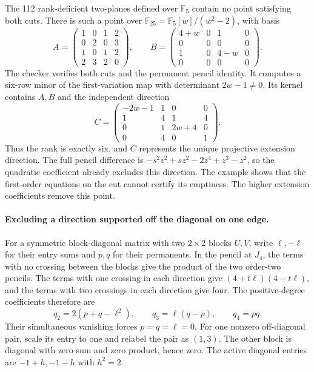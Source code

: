 The 112 rank-deficient two-planes defined over \(\mathbb F_5\) contain
no point satisfying both cuts. There is such a point over
\(\mathbb F_{25}=\mathbb F_5[w]/(w^2-2)\), with basis
\begin{equation*}
 A=\begin{pmatrix}1&0&1&2\\0&2&0&3\\1&0&1&2\\2&3&2&0\end{pmatrix},
 \qquad
 B=\begin{pmatrix}4+w&0&1&0\\0&0&0&0\\1&0&4-w&0\\0&0&0&0\end{pmatrix}.
\end{equation*}
The checker verifies both cuts and the permanent pencil identity.
It computes a six-row minor of the first-variation map with
determinant \(2w-1\ne0\). Its kernel contains \(A,B\) and the
independent direction
\begin{equation*}
 C=\begin{pmatrix}-2w-1&1&0&0\\1&4&1&4\\0&1&2w+4&0\\0&4&0&1\end{pmatrix}.
\end{equation*}
Thus the rank is exactly six, and \(C\) represents the unique
projective extension direction. The full pencil difference is
\(-s^2z^2+sz^2-2z^4+z^3-z^2\), so the quadratic coefficient
already excludes this direction. The example shows that the
first-order equations on the cut cannot certify its emptiness.
The higher extension coefficients remove this point.

\paragraph{Excluding a direction supported off the diagonal on one edge.}
For a symmetric block-diagonal matrix with two \(2\times2\)
blocks \(U,V\), write \(\ell,-\ell\) for their entry sums and \(p,q\)
for their permanents. In the pencil at \(J_4\), the terms with no
crossing between the blocks give the product of the two order-two
pencils. The terms with one crossing in each direction give
\((4+t\ell)(4-t\ell)\), and the terms with two crossings in each
direction give four. The positive-degree coefficients therefore are
\begin{equation*}
 q_2=2(p+q-\ell^2),\qquad q_3=\ell(q-p),\qquad q_4=pq.
\end{equation*}
Their simultaneous vanishing forces \(p=q=\ell=0\). For one
nonzero off-diagonal pair, scale its entry to one and relabel the
pair as \((1,3)\). The other block is diagonal with zero sum and
zero product, hence zero. The active diagonal entries are
\(-1+h,-1-h\) with \(h^2=2\).

